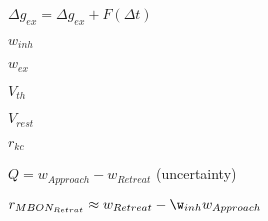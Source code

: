 $\Delta g_{ex} = \Delta g_{ex} + F(\Delta t)$

$w_{inh}$

$w_{ex}$

$V_{th}$

$V_{rest}$

$r_{kc}$

$Q = w_{Approach} - w_{Retreat}$ (uncertainty)


$r_{MBON_{Retrat}} \approx w_{Retreat} - \w_{inh} w_{Approach} $